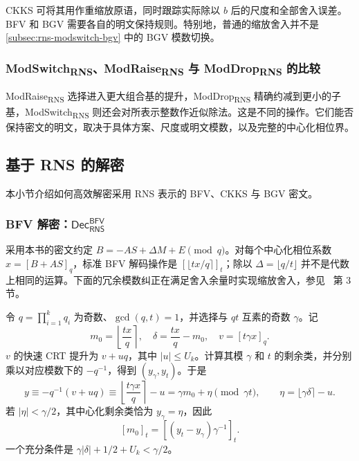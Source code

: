CKKS 可将其用作重缩放原语，同时跟踪实际除以 $b$ 后的尺度和全部舍入误差。BFV 和 BGV 需要各自的明文保持规则。特别地，普通的缩放舍入并不是 \autoref{subsec:rns-modswitch-bgv} 中的 BGV 模数切换。

\subsubsection{\textsf{ModSwitch\textsubscript{RNS}}、\textsf{ModRaise\textsubscript{RNS}} 与 \textsf{ModDrop\textsubscript{RNS}} 的比较}

\textsf{ModRaise\textsubscript{RNS}} 选择进入更大组合基的提升，\textsf{ModDrop\textsubscript{RNS}} 精确约减到更小的子基，\textsf{ModSwitch\textsubscript{RNS}} 则还会对所表示整数作近似除法。这是不同的操作。它们能否保持密文的明文，取决于具体方案、尺度或明文模数，以及完整的中心化相位界。




\subsection{基于 RNS 的解密}
\label{subsec:rns-dec}

本小节介绍如何高效解密采用 RNS 表示的 BFV、CKKS 与 BGV 密文。


\subsubsection{BFV 解密：$\textsf{Dec}_{\textsf{RNS}}^{\textsf{BFV}}$}
\label{subsubsec:rns-dec-bfv}

采用本书的密文约定 $B=-AS+\Delta M+E\pmod q$。对每个中心化相位系数 $x=[B+AS]_q$，标准 BFV 解码操作是 $[\lfloor tx/q\rceil]_t$；除以 $\Delta=\lfloor q/t\rfloor$ 并不是代数上相同的运算。下面的冗余模数纠正在满足舍入余量时实现缩放舍入，参见~\cite{rns-bfv} 第 3 节。

令 $q=\prod_{i=1}^kq_i$ 为奇数、$\gcd(q,t)=1$，并选择与 $qt$ 互素的奇数 $\gamma$。记
\[
m_0=\left\lfloor\frac{tx}{q}\right\rceil,\quad
\delta=\frac{tx}{q}-m_0,\quad v=[t\gamma x]_q.
\]
$v$ 的快速 CRT 提升为 $v+uq$，其中 $|u|\leq U_k$。计算其模 $\gamma$ 和 $t$ 的剩余类，并分别乘以对应模数下的 $-q^{-1}$，得到 $(y_\gamma,y_t)$。于是
\[
y\equiv-q^{-1}(v+uq)
\equiv\left\lfloor\frac{t\gamma x}{q}\right\rceil-u
=\gamma m_0+\eta\pmod{\gamma t},
\qquad \eta=\lfloor\gamma\delta\rceil-u.
\]
若 $|\eta|<\gamma/2$，其中心化剩余类恰为 $y_\gamma=\eta$，因此
\[
[m_0]_t=[(y_t-y_\gamma)\gamma^{-1}]_t.
\]
一个充分条件是 $\gamma|\delta|+1/2+U_k<\gamma/2$。

